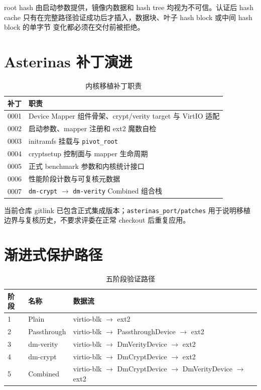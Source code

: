 root hash 由启动参数提供，镜像内数据和 hash tree 均视为不可信。认证后 hash cache
只有在完整路径验证成功后才插入，数据块、叶子 hash block 或中间 hash block 的单字节
变化都必须在交付前被拒绝。

\section{Asterinas 补丁演进}

\begin{table}[H]
    \centering
    \caption{内核移植补丁职责}
    \begin{tabular}{p{}p{}}
        \toprule
        \textbf{补丁} & \textbf{职责} \\
        \midrule
        0001 & Device Mapper 组件骨架、crypt/verity target 与 VirtIO 适配 \\
        0002 & 启动参数、mapper 注册和 ext2 魔数自检 \\
        0003 & initramfs 挂载与 \texttt{pivot\_\allowbreak root} \\
        0004 & cryptsetup 控制面与 mapper 生命周期 \\
        0005 & 正式 benchmark 参数和内核统计接口 \\
        0006 & 性能阶段计数与可复核元数据 \\
        0007 & \texttt{dm-crypt} $\to$ \texttt{dm-verity} Combined 组合栈 \\
        \bottomrule
    \end{tabular}
\end{table}

当前仓库 gitlink 已包含正式集成版本；\texttt{asterinas\_\allowbreak port/\allowbreak patches} 用于说明移植
边界与复核历史，不要求评委在正常 checkout 后重复应用。

\section{渐进式保护路径}

\begin{table}[H]
    \centering
    \caption{五阶段验证路径}
    \begin{tabular}{p{}p{}p{}}
        \toprule
        \textbf{阶段} & \textbf{名称} & \textbf{数据流} \\
        \midrule
        1 & Plain & virtio-blk $\to$ ext2 \\
        2 & Passthrough & virtio-blk $\to$ Passthrough\allowbreak Device $\to$ ext2 \\
        3 & dm-verity & virtio-blk $\to$ DmVerity\allowbreak Device $\to$ ext2 \\
        4 & dm-crypt & virtio-blk $\to$ DmCrypt\allowbreak Device $\to$ ext2 \\
        5 & Combined & virtio-blk $\to$ DmCrypt\allowbreak Device $\to$ DmVerity\allowbreak Device $\to$ ext2 \\
        \bottomrule
    \end{tabular}
\end{table}

